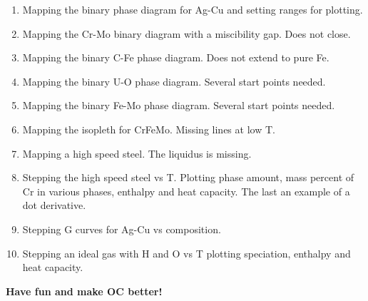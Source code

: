 \documentclass[12pt]{article}
\begin{document}
\begin{enumerate}
\item Mapping the binary phase diagram for Ag-Cu and setting ranges
  for plotting.

\item Mapping the Cr-Mo binary diagram with a miscibility gap.  Does
  not close.

\item Mapping the binary C-Fe phase diagram.  Does not extend to pure Fe.

\item Mapping the binary U-O phase diagram.  Several start points needed.

\item Mapping the binary Fe-Mo phase diagram.  Several start points
  needed.

\item Mapping the isopleth for CrFeMo.  Missing lines at low T.

\item Mapping a high speed steel.  The liquidus is missing.

\item Stepping the high speed steel vs T.  Plotting phase amount,
mass percent of Cr in various phases, enthalpy and heat capacity.
The last an example of a dot derivative.

\item Stepping G curves for Ag-Cu vs composition.

\item Stepping an ideal gas with H and O vs T plotting speciation,
enthalpy and heat capacity.

\end{enumerate}

{\large \bf Have fun and make OC better!}
\end{document}
